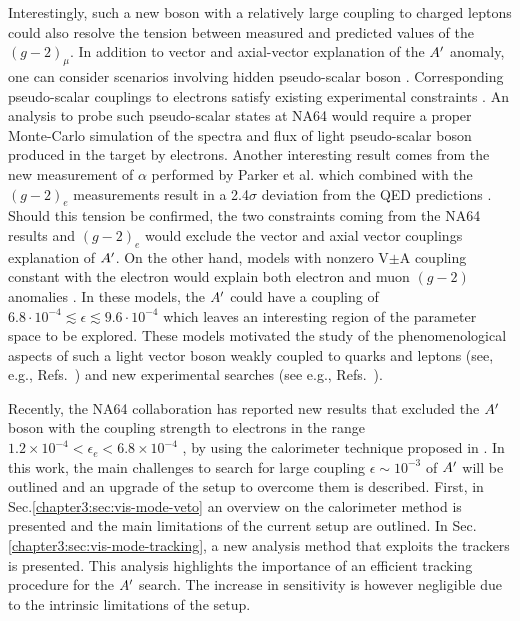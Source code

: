 Interestingly, such a new boson with a relatively large coupling to charged leptons could also resolve the tension between measured and predicted values of the $(g - 2)_{\mu}$. In addition to vector and axial-vector explanation of the $A'$ anomaly, one can consider scenarios involving hidden pseudo-scalar boson \cite{Ellwanger:2016wfe}. Corresponding pseudo-scalar couplings to electrons satisfy existing experimental constraints \cite{Andreas:2010ms,Adler:2004hp}. An analysis to probe such pseudo-scalar states at NA64 \cite{Kirpichnikov:2020tcf} would require a proper Monte-Carlo simulation of the spectra and flux of light pseudo-scalar boson produced in the target by electrons.
Another interesting result comes from the new measurement of $\alpha$ performed by Parker et al. \cite{Parker191} which combined with the $(g-2)_e$ measurements result in a 2.4$\sigma$ deviation from the QED predictions \cite{PhysRevLett.100.120801}. Should this tension be confirmed, the two constraints coming from the NA64 results and $(g - 2)_e$ would exclude the vector and axial vector couplings explanation of $A'$. On the other hand, models with nonzero V$\pm$A coupling constant with the electron would explain both electron and muon $(g - 2)$ anomalies \cite{Krasnikov:2019dgh}. In these models, the $A'$ could have a coupling of $6.8\cdot 10^{-4} \lesssim \epsilon \lesssim 9.6 \cdot 10^{-4}$ which leaves an interesting region of the parameter space to be explored.
These models motivated the study of the phenomenological aspects of such a light vector boson weakly coupled to quarks and leptons (see, e.g., Refs.~\cite{fayet1, fayet2, fayet3, fayet4,jk, cheng, Zhang:2017zap, ia, liang, bart}) 
and new experimental searches (see e.g., Refs.~\cite{mb, nardi}).

Recently, the NA64 collaboration has reported new results that excluded the $A'$ boson  with the coupling strength  to electrons in the range $1.2 \times 10^{-4} < \epsilon_e < 6.8 \times 10^{-4}$ \cite{Banerjee:2018vgk,Banerjee:2019hmi}, by using the calorimeter technique proposed in \cite{Gninenko:2013rka,Andreas:2013lya}. In this work, the main challenges to search for large coupling $\epsilon \sim 10^{-3}$ of $A'$ will be outlined and an upgrade of the setup to overcome them is described. First, in Sec.\ref{chapter3:sec:vis-mode-veto} an overview on the calorimeter method \cite{Gninenko:2013rka,Andreas:2013lya,Banerjee:2019hmi} is presented and the main limitations of the current setup are outlined. In Sec.\ref{chapter3:sec:vis-mode-tracking}, a new analysis method that exploits the trackers is presented. This analysis highlights the importance of an efficient tracking procedure for the $A'$ search. The increase in sensitivity is however negligible due to the intrinsic limitations of the setup.

